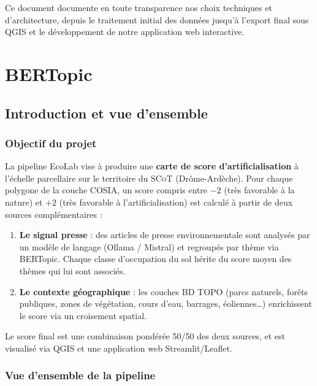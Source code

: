 \documentclass[11pt,a4paper]{report}
\newcommand{\cosia}{\textsc{COSIA}}
\newcommand{\bdtopo}{\textsc{BD TOPO}}
\newcommand{\scot}{\textsc{SCoT}}
\begin{document}
Ce document documente en toute transparence nos choix techniques et d'architecture, depuis le traitement initial des données jusqu'à l'export final sous QGIS et le développement de notre application web interactive.

\chapter{BERTopic}

\section{Introduction et vue d'ensemble}

\subsection{Objectif du projet}

La pipeline EcoLab vise à produire une \textbf{carte de score d'artificialisation} à l'échelle parcellaire sur le territoire du \scot{} (Drôme-Ardèche). Pour chaque polygone de la couche \cosia{}, un score compris entre $-2$ (très favorable à la nature) et $+2$ (très favorable à l'artificialisation) est calculé à partir de deux sources complémentaires :

\begin{enumerate}
  \item \textbf{Le signal presse} : des articles de presse environnementale sont analysés par un modèle de langage (Ollama / Mistral) et regroupés par thème via BERTopic. Chaque classe d'occupation du sol hérite du score moyen des thèmes qui lui sont associés.
  \item \textbf{Le contexte géographique} : les couches \bdtopo{} (parcs naturels, forêts publiques, zones de végétation, cours d'eau, barrages, éoliennes…) enrichissent le score via un croisement spatial.
\end{enumerate}

Le score final est une combinaison pondérée 50/50 des deux sources, et est visualisé via QGIS et une application web Streamlit/Leaflet.

\subsection{Vue d'ensemble de la pipeline}
\end{document}
